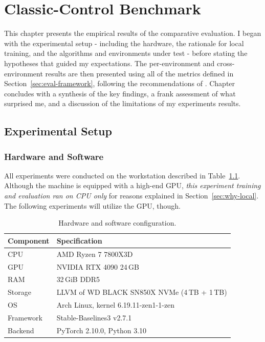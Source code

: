 



\chapter[EXP1: Classic-Control Benchmark]{Classic-Control Benchmark}
\label{chap:exp1}

This chapter presents the empirical results of the comparative evaluation.
I began with the experimental setup - including the hardware, the
rationale for local training, and the algorithms and environments
under test - before stating the hypotheses that guided my expectations.
The per-environment and cross-environment results are then presented
using all of the metrics defined in Section~\ref{sec:eval-framework}, following the recommendations of \citet{agarwal2021precipice}. Chapter concludes with a synthesis of the key findings, a frank assessment of what surprised me, and a discussion of the limitations of my experiments results.

\section{Experimental Setup}
\label{sec:setup}

\subsection{Hardware and Software}
\label{sec:hardware}

All experiments were conducted on the workstation described in
Table~\ref{tab:hardware}. Although the machine is equipped with a
high-end GPU, \emph{this experiment training and evaluation ran on CPU only}
for reasons explained in Section~\ref{sec:why-local}. The following experiments will utilize the GPU, though.

\begin{table}[htbp!]
\centering
\caption[EXP1: Hardware configuration]{Hardware and software configuration.}
\label{tab:hardware}
\begin{tabular}{ll}
\toprule
\textbf{Component}   & \textbf{Specification} \\
\midrule
CPU         & AMD Ryzen 7 7800X3D \\
GPU         & NVIDIA RTX 4090 24\,GB \\
RAM         & 32\,GiB DDR5 \\
Storage     & LLVM of WD BLACK SN850X NVMe (4\,TB + 1\,TB) \\
OS          & Arch Linux, kernel 6.19.11-zen1-1-zen \\
Framework   & Stable-Baselines3 v2.7.1 \citep{raffin2021sb3} \\
Backend     & PyTorch 2.10.0, Python 3.10 \\
\bottomrule
\end{tabular}
\end{table}

